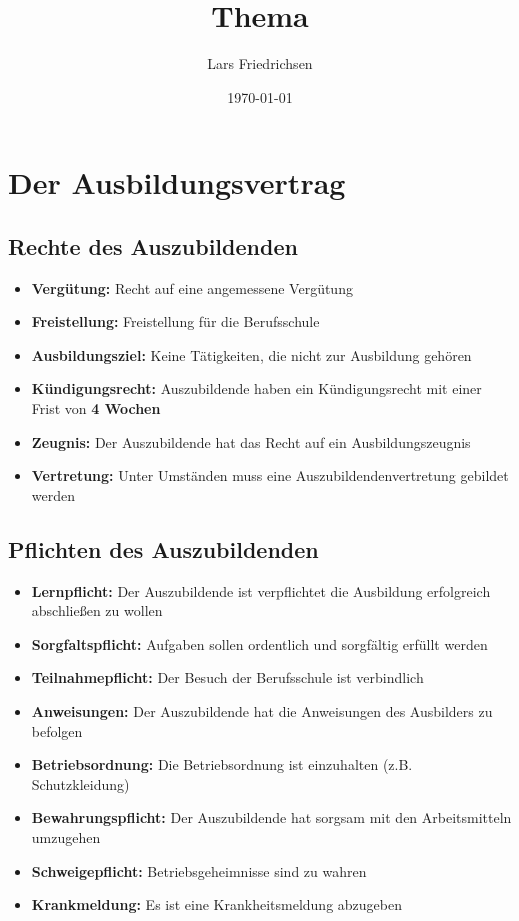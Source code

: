 \documentclass[a4paper,11pt]{scrartcl}	%
\title{Thema}
\author{Lars Friedrichsen}
\date{\today}
\begin{document}
\section{Der Ausbildungsvertrag}

	\subsection{Rechte des Auszubildenden}
		\begin{itemize}
			\item \textbf{Vergütung:} Recht auf eine angemessene Vergütung
			\item \textbf{Freistellung:} Freistellung für die Berufsschule
			\item \textbf{Ausbildungsziel:} Keine Tätigkeiten, die nicht zur Ausbildung gehören 
			\item \textbf{Kündigungsrecht:} Auszubildende haben ein Kündigungsrecht mit einer Frist von \textbf{4 Wochen}
			\item \textbf{Zeugnis:} Der Auszubildende hat das Recht auf ein Ausbildungszeugnis
			\item \textbf{Vertretung:} Unter Umständen muss eine Auszubildendenvertretung gebildet werden
		\end{itemize}
	
	\subsection{Pflichten des Auszubildenden}
		\begin{itemize}
			\item \textbf{Lernpflicht:} Der Auszubildende ist verpflichtet die Ausbildung erfolgreich abschließen zu wollen
			\item \textbf{Sorgfaltspflicht:} Aufgaben sollen ordentlich und sorgfältig erfüllt werden 
			\item \textbf{Teilnahmepflicht:} Der Besuch der Berufsschule ist verbindlich
			\item \textbf{Anweisungen:} Der Auszubildende hat die Anweisungen des Ausbilders zu befolgen
			\item \textbf{Betriebsordnung:} Die Betriebsordnung ist einzuhalten (z.B. Schutzkleidung)
			\item \textbf{Bewahrungspflicht:} Der Auszubildende hat sorgsam mit den Arbeitsmitteln umzugehen
			\item \textbf{Schweigepflicht:} Betriebsgeheimnisse sind zu wahren
			\item \textbf{Krankmeldung:} Es ist eine Krankheitsmeldung abzugeben
		\end{itemize}
	
\end{document}
